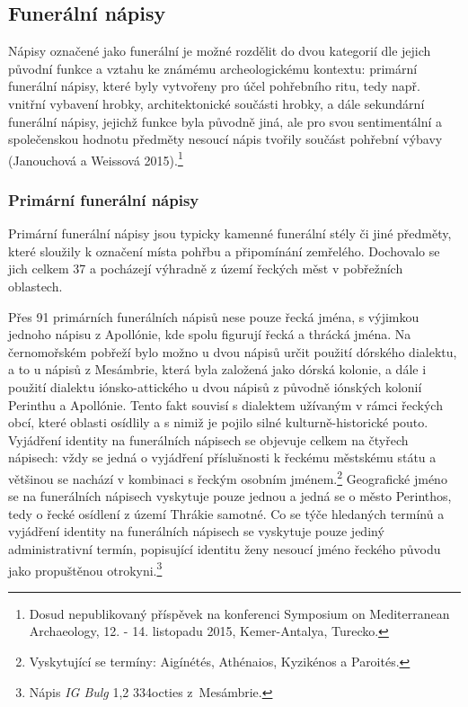 
\subsection[funerální-nápisy-1]{Funerální nápisy}

Nápisy označené jako funerální je možné rozdělit do dvou kategorií dle jejich původní funkce a vztahu ke známému archeologickému kontextu: primární funerální nápisy, které byly vytvořeny pro účel pohřebního ritu, tedy např. vnitřní vybavení hrobky, architektonické součásti hrobky, a dále sekundární funerální nápisy, jejichž funkce byla původně jiná, ale pro svou sentimentální a společenskou hodnotu předměty nesoucí nápis tvořily součást pohřební výbavy (Janouchová a Weissová 2015).\footnote{Dosud nepublikovaný příspěvek na konferenci Symposium on Mediterranean Archaeology, 12. - 14. listopadu 2015, Kemer-Antalya, Turecko.}

\subsubsection[primární-funerální-nápisy]{Primární funerální nápisy}

Primární funerální nápisy jsou typicky kamenné funerální stély či jiné předměty, které sloužily k označení místa pohřbu a připomínání zemřelého. Dochovalo se jich celkem 37 a pocházejí výhradně z území řeckých měst v pobřežních oblastech.

Přes 91  primárních funerálních nápisů nese pouze řecká jména, s výjimkou jednoho nápisu z Apollónie, kde spolu figurují řecká a thrácká jména. Na černomořském pobřeží bylo možno u dvou nápisů určit použití dórského dialektu, a to u nápisů z Mesámbrie, která byla založená jako dórská kolonie, a dále i použití dialektu iónsko-attického u dvou nápisů z původně iónských kolonií Perinthu a Apollónie. Tento fakt souvisí s dialektem užívaným v rámci řeckých obcí, které oblasti osídlily a s nimiž je pojilo silné kulturně-historické pouto. Vyjádření identity na funerálních nápisech se objevuje celkem na čtyřech nápisech: vždy se jedná o vyjádření příslušnosti k řeckému městskému státu a většinou se nachází v kombinaci s řeckým osobním jménem.\footnote{Vyskytující se termíny: Aigínétés, Athénaios, Kyzikénos a Paroités.} Geografické jméno se na funerálních nápisech vyskytuje pouze jednou a jedná se o město Perinthos, tedy o řecké osídlení z území Thrákie samotné. Co se týče hledaných termínů a vyjádření identity na funerálních nápisech se vyskytuje pouze jediný administrativní termín, popisující identitu ženy nesoucí jméno řeckého původu jako propuštěnou otrokyni.\footnote{Nápis {\em IG Bulg} 1,2 334octies z~Mesámbrie.}

